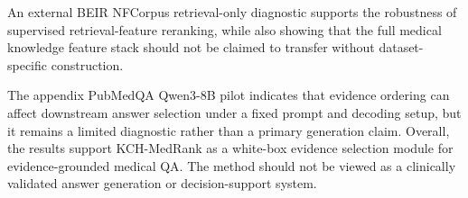 An external BEIR NFCorpus retrieval-only diagnostic supports the robustness of supervised retrieval-feature reranking, while also showing that the full medical knowledge feature stack should not be claimed to transfer without dataset-specific construction.

The appendix PubMedQA Qwen3-8B pilot indicates that evidence ordering can affect downstream answer selection under a fixed prompt and decoding setup, but it remains a limited diagnostic rather than a primary generation claim. Overall, the results support KCH-MedRank as a white-box evidence selection module for evidence-grounded medical QA. The method should not be viewed as a clinically validated answer generation or decision-support system.
